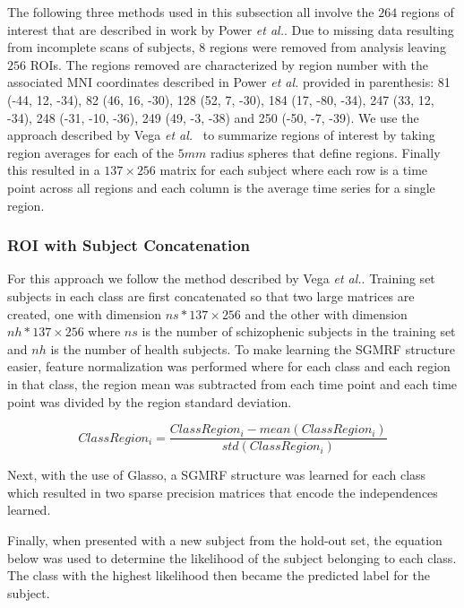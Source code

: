 \documentclass{article} %
\begin{document}
The following three methods used in this subsection all involve the $264$  
regions of interest that are described in work by Power \emph{et al.}.
Due to missing data resulting from incomplete scans of subjects, $8$
regions were removed from analysis leaving $256$ ROIs. The regions removed
are characterized by region number with the associated MNI coordinates 
described in Power \emph{et al.} provided in parenthesis: 81 (-44, 12, -34), 
82 (46, 16, -30), 128 (52, 7, -30), 184 (17, -80, -34), 247 (33, 12, -34), 
248 (-31, -10, -36), 249 (49, -3, -38) and 250 (-50, -7, -39). We use the
approach described by Vega \emph{et al.}~\cite{rvega} to summarize
regions of interest by taking region averages for each of the $5mm$ radius
spheres that define regions. Finally this resulted in a $137 \times 256$ matrix
for each subject where each row is a time point across all regions and each
column is the average time series for a single region.


\subsubsection{ROI with Subject Concatenation}

For this approach we follow the method described by Vega \emph{et al.}.
Training set subjects in each class are first concatenated so that two large 
matrices are created, one with dimension $ns * 137 \times 256$ and the other 
with dimension $nh * 137 \times 256$ where $ns$ is the number of schizophenic 
subjects in the training set and $nh$ is the number of health subjects. To
make learning the SGMRF structure easier, feature normalization was performed
where for each class and each region in that class, the region mean was 
subtracted from each time point and each time point was divided by the 
region standard deviation.

\begin{equation}
ClassRegion_i = \frac{ClassRegion_i - mean(ClassRegion_i)}{std(ClassRegion_i)}
\end{equation}

Next, with the use of Glasso, a SGMRF structure was learned for each class 
which resulted in two sparse precision matrices that encode the independences
learned. 

Finally, when presented with a new subject from the hold-out set, the equation
below was used to determine the likelihood of the subject belonging to each
class. The class with the highest likelihood then became the predicted label
for the subject.
\end{document}
